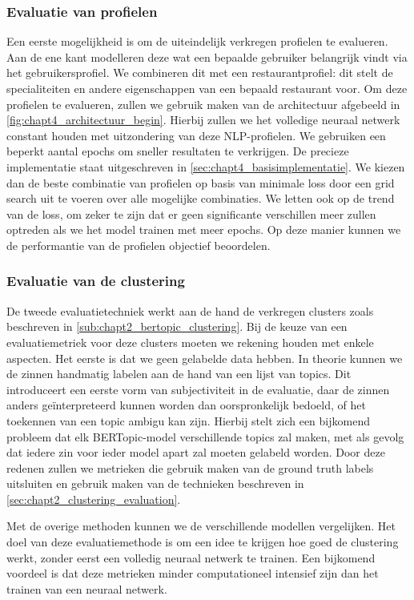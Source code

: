\subsubsection{Evaluatie van profielen}
\label{sub:chapt4_evaluatie_profielen}
Een eerste mogelijkheid is om de uiteindelijk verkregen profielen te evalueren. Aan de ene kant modelleren deze wat een bepaalde gebruiker belangrijk vindt via het gebruikersprofiel. We combineren dit met een restaurantprofiel: dit stelt de specialiteiten en andere eigenschappen van een bepaald restaurant voor. Om deze profielen te evalueren, zullen we gebruik maken van de architectuur afgebeeld in \autoref{fig:chapt4_architectuur_begin}. Hierbij zullen we het volledige neuraal netwerk constant houden met uitzondering van deze NLP-profielen. We gebruiken een beperkt aantal epochs om sneller resultaten te verkrijgen. De precieze implementatie staat uitgeschreven in \autoref{sec:chapt4_basisimplementatie}. We kiezen dan de beste combinatie van profielen op basis van minimale loss door een grid search uit te voeren over alle mogelijke combinaties. We letten ook op de trend van de loss, om zeker te zijn dat er geen significante verschillen meer zullen optreden als we het model trainen met meer epochs. Op deze manier kunnen we de performantie van de profielen objectief beoordelen.

\subsubsection{Evaluatie van de clustering}

De tweede evaluatietechniek werkt aan de hand de verkregen clusters zoals beschreven in \autoref{sub:chapt2_bertopic_clustering}. Bij de keuze van een evaluatiemetriek voor deze clusters moeten we rekening houden met enkele aspecten. Het eerste is dat we geen gelabelde data hebben. In theorie kunnen we de zinnen handmatig labelen aan de hand van een lijst van topics. Dit introduceert een eerste vorm van subjectiviteit in de evaluatie, daar de zinnen anders geïnterpreteerd kunnen worden dan oorspronkelijk bedoeld, of het toekennen van een topic ambigu kan zijn. Hierbij stelt zich een bijkomend probleem dat elk BERTopic-model verschillende topics zal maken, met als gevolg dat iedere zin voor ieder model apart zal moeten gelabeld worden. Door deze redenen zullen we metrieken die gebruik maken van de ground truth labels uitsluiten en gebruik maken van de technieken beschreven in \autoref{sec:chapt2_clustering_evaluation}.

Met de overige methoden kunnen we de verschillende modellen vergelijken. Het doel van deze evaluatiemethode is om een idee te krijgen hoe goed de clustering werkt, zonder eerst een volledig neuraal netwerk te trainen. Een bijkomend voordeel is dat deze metrieken minder computationeel intensief zijn dan het trainen van een neuraal netwerk.

